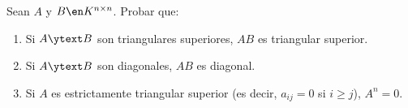 \begin{enunciado}{\ejercicio}
  Sean $A$ y $B \en K^{n \times n}$. Probar que:
  \begin{enumerate}[label=(\alph*)]
    \item Si $A \ytext B$ son triangulares superiores, $AB$ es triangular superior.
    \item Si $A \ytext B$ son diagonales, $AB$ es diagonal.
    \item Si $A$ es estrictamente triangular superior (es decir, $a_{ij} = 0$ si $i\geq j$), $A^n = 0$.
  \end{enumerate}
\end{enunciado}

\def\triangularSuperior{
  \begin{tikzpicture}[baseline=-6, scale = 0.5]
    \draw[blue, thin, fill=blue!20,yshift = -4, xshift = -8] (-1,1) -- (1.7,1) -- (1.7,-0.7) -- cycle;
    \node at (0,0) {
      $
        \matriz{cc}{
          \quad &  a_{\green{i}\blue{j}} \\
          0 &
        }
      $
    };
  \end{tikzpicture}
}

\def\diagonal{
  \begin{tikzpicture}[baseline=-6, scale = 0.5]
    \draw[blue, thin, fill=blue!20,yshift = 0, xshift = 0, rotate = -45] (-1.1,0.3) rectangle (1.1,-.3);
    \node at (0,0) {
      $
        \matriz{cc}{
          &  0 \\
          0 &
        }
      $
    };
  \end{tikzpicture}
}

\def\triangularSuperiorEstricta{
  \begin{tikzpicture}[baseline=-6, scale = 0.5]
    \draw[blue, thin, fill=blue!20,yshift = 0, xshift = 0] (-0.6,0.8) -- ++(0,-0.5) -- (0.2,-0.1) -- ++(0.8,0) -- (1,0.8) -- cycle;
    \node at (0,0) {
      $
        \matriz{cc}{
          0 &  a_{\green{i}\blue{j}} \\
          0 & 0
        }
      $
    };
  \end{tikzpicture}
}


